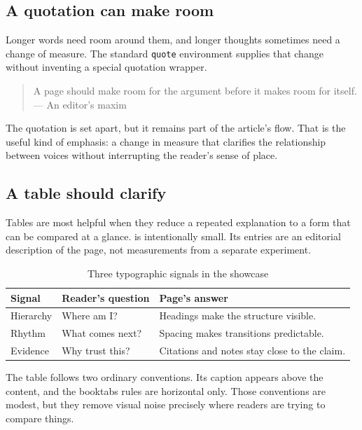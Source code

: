 \documentclass[11pt]{article}
\begin{document}
\subsection{A quotation can make room}
\label{subsec:quotation}

Longer words need room around them, and longer thoughts sometimes need a change
of measure.
The standard \texttt{quote} environment supplies that change without inventing
a special quotation wrapper.

\begin{quote}
  A page should make room for the argument before it makes room for itself.
  \hfill--- An editor's maxim
\end{quote}

The quotation is set apart, but it remains part of the article's flow.
That is the useful kind of emphasis: a change in measure that clarifies the
relationship between voices without interrupting the reader's sense of place.

\subsection{A table should clarify}
\label{subsec:table}

Tables are most helpful when they reduce a repeated explanation to a form that
can be compared at a glance.
 is intentionally small.
Its entries are an editorial description of the page, not measurements from a
separate experiment.

\begin{table}[tbp]
  \caption{Three typographic signals in the showcase}
  \label{tab:signals}
  \centering
  \begin{tabular}{@{}p{}p{}p{}@{}}
    \toprule
    Signal & Reader's question & Page's answer \\
    \midrule
    Hierarchy & Where am I? & Headings make the structure visible. \\
    Rhythm & What comes next? & Spacing makes transitions predictable. \\
    Evidence & Why trust this? & Citations and notes stay close to the claim. \\
    \bottomrule
  \end{tabular}
\end{table}

The table follows two ordinary conventions.
Its caption appears above the content, and the booktabs rules are horizontal
only.
Those conventions are modest, but they remove visual noise precisely where
readers are trying to compare things.
\end{document}
